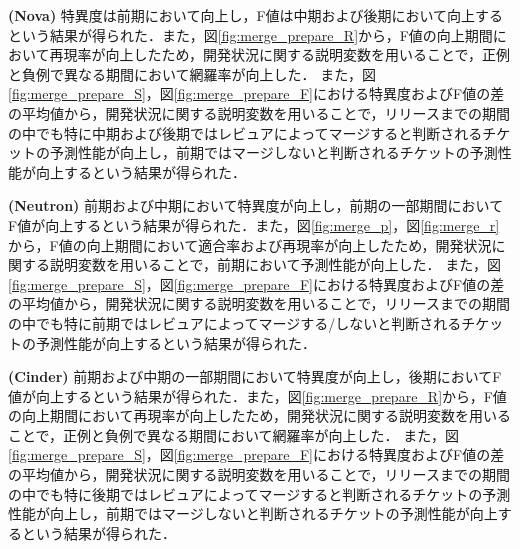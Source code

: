 \documentclass[submit]{ipsj}
\begin{document}
\textbf{ (Nova) }特異度は前期において向上し，F値は中期および後期において向上するという結果が得られた．また，図\ref{fig:merge_prepare_R}から，F値の向上期間において再現率が向上したため，開発状況に関する説明変数を用いることで，正例と負例で異なる期間において網羅率が向上した．
また，図\ref{fig:merge_prepare_S}，図\ref{fig:merge_prepare_F}における特異度およびF値の差の平均値から，開発状況に関する説明変数を用いることで，リリースまでの期間の中でも特に中期および後期ではレビュアによってマージすると判断されるチケットの予測性能が向上し，前期ではマージしないと判断されるチケットの予測性能が向上するという結果が得られた．

\textbf{ (Neutron) }前期および中期において特異度が向上し，前期の一部期間においてF値が向上するという結果が得られた．また，図\ref{fig:merge_p}，図\ref{fig:merge_r}から，F値の向上期間において適合率および再現率が向上したため，開発状況に関する説明変数を用いることで，前期において予測性能が向上した．
また，図\ref{fig:merge_prepare_S}，図\ref{fig:merge_prepare_F}における特異度およびF値の差の平均値から，開発状況に関する説明変数を用いることで，リリースまでの期間の中でも特に前期ではレビュアによってマージする/しないと判断されるチケットの予測性能が向上するという結果が得られた．

\textbf{ (Cinder) }前期および中期の一部期間において特異度が向上し，後期においてF値が向上するという結果が得られた．また，図\ref{fig:merge_prepare_R}から，F値の向上期間において再現率が向上したため，開発状況に関する説明変数を用いることで，正例と負例で異なる期間において網羅率が向上した．
また，図\ref{fig:merge_prepare_S}，図\ref{fig:merge_prepare_F}における特異度およびF値の差の平均値から，開発状況に関する説明変数を用いることで，リリースまでの期間の中でも特に後期ではレビュアによってマージすると判断されるチケットの予測性能が向上し，前期ではマージしないと判断されるチケットの予測性能が向上するという結果が得られた．
\end{document}
